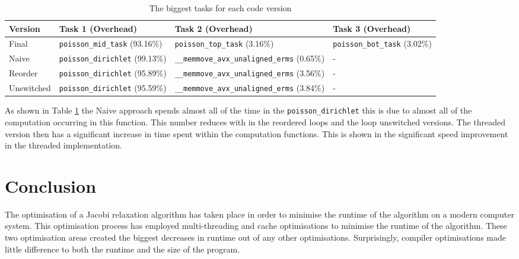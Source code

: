 \documentclass[12pt]{article}
\begin{document}
\begin{table}[H]
    \centering
    \caption{The biggest tasks for each code version}
    \label{table:perf}
    \begin{tabular}{ | m{2cm} | m{4cm} | m{6cm} | m{3.5cm} | }
        \hline
        Version & Task 1 (Overhead) & Task 2 (Overhead) & Task 3 (Overhead)\\
        \hline
        Final & \texttt{poisson\_mid\_task} (93.16\%) & \texttt{poisson\_top\_task} (3.16\%) & \texttt{poisson\_bot\_task} (3.02\%)\\
        \hline
        Naive & \texttt{poisson\_dirichlet} (99.13\%) & \texttt{\_\_memmove\_avx\_unaligned\_erms} (0.65\%) & -\\
        \hline
        Reorder & \texttt{poisson\_dirichlet} (95.89\%) & \texttt{\_\_memmove\_avx\_unaligned\_erms} (3.56\%) & -\\
        \hline
        Unswitched & \texttt{poisson\_dirichlet} (95.59\%) & \texttt{\_\_memmove\_avx\_unaligned\_erms} (3.84\%) & -\\
        \hline
    \end{tabular}
\end{table}

As shown in Table \ref{table:perf} the Naive approach spends almost all of the time in the \texttt{poisson\_dirichlet} this is
due to almost all of the computation occurring in this function. This number reduces with in the reordered loops and the loop
unswitched versions. The threaded version then has a significant increase in time spent within the computation functions.
This is shown in the significant speed improvement in the threaded implementation.

\section{Conclusion}
The optimisation of a Jacobi relaxation algorithm has taken place in order to minimise the runtime of the algorithm
on a modern computer system. This optimisation process has employed multi-threading and cache optimisations to
minimise the runtime of the algorithm. These two optimisation areas created the biggest decreases in runtime out
of any other optimisations. Surprisingly, compiler optimisations made little difference to both the runtime and
the size of the program.

\newpage
\medskip


\end{document}
